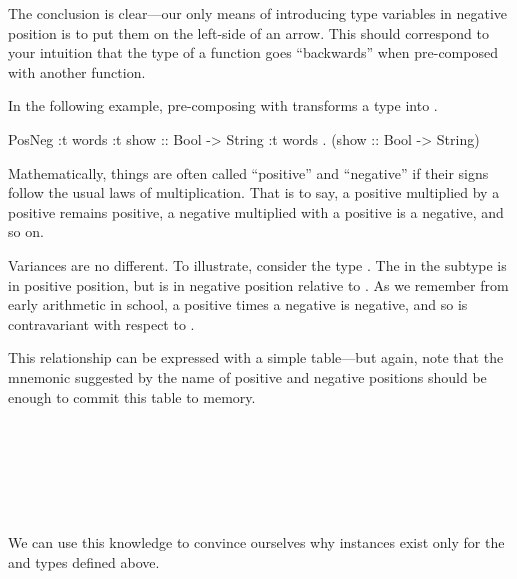 \documentclass[book.tex]{subfiles}
\begin{document}
The conclusion is clear---our only means of introducing type variables in
negative position is to put them on the left-side of an arrow. This should
correspond to your intuition that the type of a function goes ``backwards'' when
pre-composed with another function.

In the following example, pre-composing with 
transforms a type  into .

\begin{dorepl}{PosNeg}
:t words
:t show :: Bool -> String
:t words . (show :: Bool -> String)
\end{dorepl}

Mathematically, things are often called ``positive'' and ``negative'' if their
signs follow the usual laws of multiplication. That is to say, a positive
multiplied by a positive remains positive, a negative multiplied with a positive
is a negative, and so on.

Variances are no different. To illustrate, consider the type . The  in the subtype  is in positive position, but
 is in negative position relative to . As we
remember from early arithmetic in school, a positive times a negative is
negative, and so  is contravariant with respect to .

This relationship can be expressed with a simple table---but again, note that
the mnemonic suggested by the name of positive and negative positions should be
enough to commit this table to memory.

\spaceMyBox
\begin{myTable}
\hline
   \\ \hline
  \myRow{\myCol{$+$} \myCol{$+$} \myLastCol{$+$}} \\ \hline
  \myRow{\myCol{$+$} \myCol{$-$} \myLastCol{$-$}} \\ \hline
  \myRow{\myCol{$-$} \myCol{$+$} \myLastCol{$-$}} \\ \hline
  \myRow{\myCol{$-$} \myCol{$-$} \myLastCol{$+$}} \\ \hline
\end{myTable}
\spaceMyBox

We can use this knowledge to convince ourselves why  instances exist
only for the  and  types defined above.

\newcommand{\tyAnno}[4]{\ty{#1} \qquad&\cong\qquad #2 & #3 &= #4 \\ \\}
\end{document}
